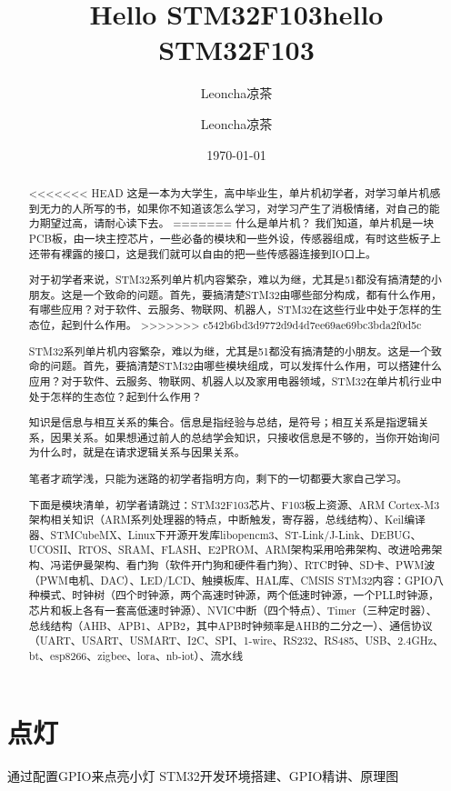 \documentclass[UTF8]{ctexart}
\title{Hello STM32F103}
\author{Leoncha凉茶}
\title{hello STM32F103}
\author{Leoncha凉茶}
\date{\today}
\begin{document}
\maketitle
{}
\newpage

\begin{abstract}
<<<<<<< HEAD
这是一本为大学生，高中毕业生，单片机初学者，对学习单片机感到无力的人所写的书，如果你不知道该怎么学习，对学习产生了消极情绪，对自己的能力期望过高，请耐心读下去。
=======
什么是单片机？
我们知道，单片机是一块PCB板，由一块主控芯片，一些必备的模块和一些外设，传感器组成，有时这些板子上还带有裸露的接口，这是我们就可以自由的把一些传感器连接到IO口上。


对于初学者来说，STM32系列单片机内容繁杂，难以为继，尤其是51都没有搞清楚的小朋友。这是一个致命的问题。首先，要搞清楚STM32由哪些部分构成，都有什么作用，有哪些应用？对于软件、云服务、物联网、机器人，STM32在这些行业中处于怎样的生态位，起到什么作用。
>>>>>>> c542b6bd3d9772d9d4d7ee69ae69bc3bda2f0d5c

STM32系列单片机内容繁杂，难以为继，尤其是51都没有搞清楚的小朋友。这是一个致命的问题。首先，要搞清楚STM32由哪些模块组成，可以发挥什么作用，可以搭建什么应用？对于软件、云服务、物联网、机器人以及家用电器领域，STM32在单片机行业中处于怎样的生态位？起到什么作用？

知识是信息与相互关系的集合。信息是指经验与总结，是符号；相互关系是指逻辑关系，因果关系。如果想通过前人的总结学会知识，只接收信息是不够的，当你开始询问为什么时，就是在请求逻辑关系与因果关系。

笔者才疏学浅，只能为迷路的初学者指明方向，剩下的一切都要大家自己学习。

下面是模块清单，初学者请跳过：STM32F103芯片、F103板上资源、ARM Cortex-M3架构相关知识（ARM系列处理器的特点，中断触发，寄存器，总线结构）、Keil编译器、STMCubeMX、Linux下开源开发库libopencm3、ST-Link/J-Link、DEBUG、UCOSII、RTOS、SRAM、FLASH、E2PROM、ARM架构采用哈弗架构、改进哈弗架构、冯诺伊曼架构、看门狗（软件开门狗和硬件看门狗）、RTC时钟、SD卡、PWM波（PWM电机、DAC）、LED/LCD、触摸板库、HAL库、CMSIS
STM32内容：GPIO八种模式、时钟树（四个时钟源，两个高速时钟源，两个低速时钟源，一个PLL时钟源，芯片和板上各有一套高低速时钟源）、NVIC中断（四个特点）、Timer（三种定时器）、总线结构（AHB、APB1、APB2，其中APB时钟频率是AHB的二分之一）、通信协议（UART、USART、USMART、I2C、SPI、1-wire、RS232、RS485、USB、2.4GHz、bt、esp8266、zigbee、lora、nb-iot）、流水线
\end{abstract}



\section{点灯}
通过配置GPIO来点亮小灯
STM32开发环境搭建、GPIO精讲、原理图
\end{document}
